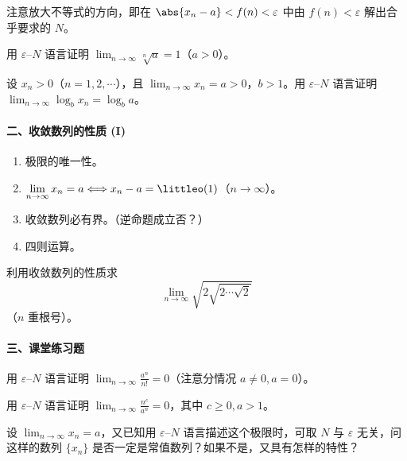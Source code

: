 注意放大不等式的方向，即在 $\abs{x_n-a}<f(n)<\varepsilon$ 中由 $f(n)<\varepsilon$ 解出合乎要求的 $N$。

\begin{xexample}[1.1]
用 $\varepsilon$--$N$ 语言证明 $\displaystyle\lim_{n\to\infty}\sqrt[n]a=1$（$a>0$）。
\end{xexample}

\begin{xexample}[1.2]
设 $x_n>0$（$n=1,2,\cdots$），且 $\displaystyle\lim_{n\to\infty}x_n=a>0$，$b>1$。用 $\varepsilon$--$N$ 语言证明 $\displaystyle\lim_{n\to\infty}\log_bx_n=\log_ba$。
\end{xexample}

\paragraph{二、收敛数列的性质 (I)}

\begin{enumerate}[label=\arabic*.]
  \item 极限的唯一性。
  \item $\displaystyle\lim_{n\to\infty}x_n=a\Longleftrightarrow x_n-a=\littleo(1)$（$n\to\infty$）。
  \item 收敛数列必有界。（逆命题成立否？）
  \item 四则运算。
\end{enumerate}

\begin{xexample}[2.1]
利用收敛数列的性质求
\[
  \lim_{n\to\infty}\sqrt{2\sqrt{2\cdots\sqrt2}}
\]
（$n$ 重根号）。
\end{xexample}

\paragraph{三、课堂练习题}

\begin{xexercise}[1]
用 $\varepsilon$--$N$ 语言证明 $\displaystyle\lim_{n\to\infty}\frac{a^n}{n!}=0$（注意分情况 $a\ne0,a=0$）。
\end{xexercise}

\begin{xexercise}[2]
用 $\varepsilon$--$N$ 语言证明 $\displaystyle\lim_{n\to\infty}\frac{n^c}{a^n}=0$，其中 $c\ge0,a>1$。
\end{xexercise}

\begin{xexercise}[3]
设 $\displaystyle\lim_{n\to\infty}x_n=a$，又已知用 $\varepsilon$--$N$ 语言描述这个极限时，可取 $N$ 与 $\varepsilon$ 无关，问这样的数列 $\{x_n\}$ 是否一定是常值数列？如果不是，又具有怎样的特性？
\end{xexercise}


